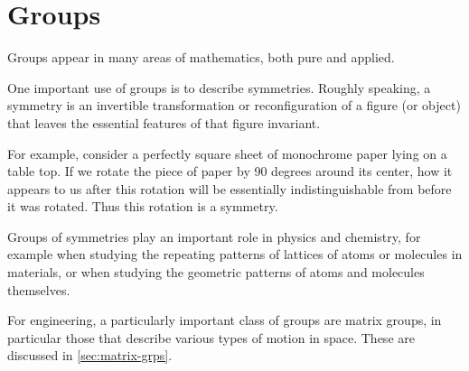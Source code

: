 
\section{Groups}
\label{sec:groups}

Groups appear in many areas of mathematics, both pure and applied.

One important use of groups is to describe symmetries.
Roughly speaking, a symmetry is an invertible transformation or reconfiguration of a figure (or object) that leaves the essential features of that figure invariant.

For example, consider a perfectly square sheet of monochrome paper lying on a table top.
If we rotate the piece of paper by 90 degrees around its center, how it appears to us after this rotation will be essentially indistinguishable from before it was rotated.
Thus this rotation is a symmetry.

Groups of symmetries play an important role in physics and chemistry, for example when studying the repeating patterns of lattices of atoms or molecules in materials, or when studying the geometric patterns of atoms and molecules themselves.

For engineering, a particularly important class of groups are matrix groups, in particular those that describe various types of motion in space. These are discussed in \cref{sec:matrix-grps}.

